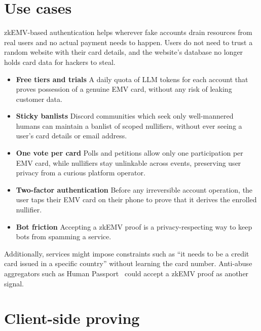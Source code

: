 \documentclass[10pt,a4paper]{article}
\begin{document}
\section{Use cases}

zkEMV-based authentication helps wherever fake accounts drain resources from real users and no actual payment needs to happen.
Users do not need to trust a random website with their card details, and the website's database no longer holds card data for hackers to steal.

\begin{itemize}
\item \textbf{Free tiers and trials}
A daily quota of LLM tokens for each account that proves possession of a genuine EMV card, without any risk of leaking customer data.
\item \textbf{Sticky banlists}
Discord communities which seek only well-mannered humans can maintain a banlist of scoped nullifiers, without ever seeing a user's card details or email address.
\item \textbf{One vote per card}
Polls and petitions allow only one participation per EMV card, while nullifiers stay unlinkable across events, preserving user privacy from a curious platform operator.
\item \textbf{Two-factor authentication}
Before any irreversible account operation, the user taps their EMV card on their phone to prove that it derives the enrolled nullifier.
\item \textbf{Bot friction}
Accepting a zkEMV proof is a privacy-respecting way to keep bots from spamming a service.
\end{itemize}

Additionally, services might impose constraints such as ``it needs to be a credit card issued in a specific country'' without learning the card number.
Anti-abuse aggregators such as Human Passport~\cite{human-passport} could accept a zkEMV proof as another signal.

\section{Client-side proving}
\end{document}
